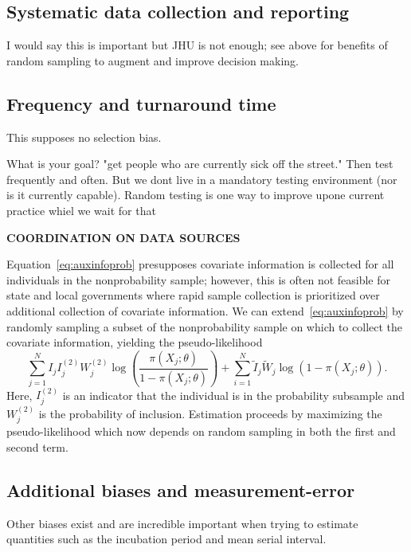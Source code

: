 \documentclass[11pt]{amsart}
\numberwithin{equation}{section}
\theoremstyle{plain}
\begin{document}
\subsection*{Systematic data collection and reporting}

I would say this is important but JHU is not enough; see above for benefits of random sampling to augment and improve decision making.

\subsection*{Frequency and turnaround time}

This supposes no selection bias.




What is your goal?  "get people who are currently sick off the street." Then test frequently and often.  But we dont live in a mandatory testing environment (nor is it currently capable).  Random testing is one way to improve upone current practice whiel we wait for that

{\bf COORDINATION ON DATA SOURCES}

Equation~\eqref{eq:auxinfoprob} presupposes covariate information is collected for all individuals in the nonprobability sample; however, this is often not feasible for state and local governments where rapid sample collection is prioritized over additional collection of covariate information.  We can extend~\eqref{eq:auxinfoprob} by randomly sampling a subset of the nonprobability sample on which to collect the covariate information, yielding the pseudo-likelihood
\begin{equation}
\label{eq:auxinfoprob2}
\sum_{j=1}^N I_j I_j^{(2)} W_j^{(2)} \log \left( \frac{\pi (X_j; \theta)}{1-\pi(X_j; \theta)} \right)  + \sum_{i=1}^N \tilde I_j \tilde W_j \log ( 1 - \pi (X_j; \theta)).
\end{equation}
Here, $I_j^{(2)}$ is an indicator that the individual is in the probability subsample and $W_j^{(2)}$ is the probability of inclusion.  Estimation proceeds by maximizing the pseudo-likelihood which now depends on random sampling in both the first and second term.

\subsection*{Additional biases and measurement-error}

Other biases exist and are incredible important when trying to estimate quantities such as the incubation period and mean serial interval.
\end{document}
